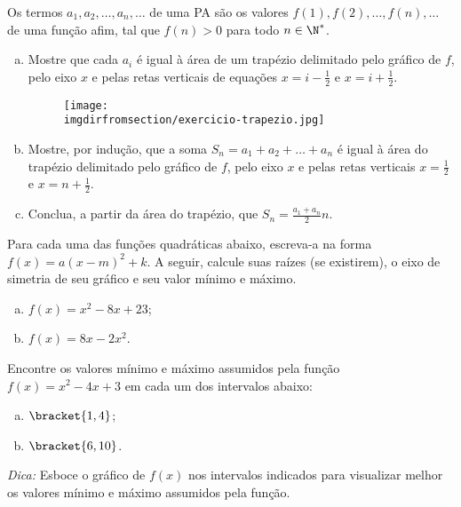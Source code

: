 \begin{exercise}
  Os termos $a_1, a_2, \dots, a_n, \dots$ de uma PA são os valores
  $f(1), f(2), \dots, f(n), \dots$ de uma função afim, tal que $f(n)
  >0$ para todo $n \in \N^\ast$.

  \begin{enumerate}[(a)]
    \item Mostre que cada $a_i$ é igual à área de um trapézio
    delimitado pelo gráfico de $f$, pelo eixo $x$ e pelas retas
    verticais de equações $x=i - \frac 1 2 $ e $x = i + \frac 1 2$.
    
    \begin{figure}[H]
      \centering\texttt{[image: \\imgdirfromsection/exercicio-trapezio.jpg]}
      \label{fig:exercicio-trapezio}
    \end{figure}

    \item Mostre, por indução, que a soma $S_n = a_1+a_2+ \dots + a_n$ é igual à
    área do trapézio delimitado pelo gráfico de $f$, pelo eixo $x$ e
    pelas retas verticais $x= \frac 1 2$ e $x = n + \frac 1 2 $.
    \item Conclua, a partir da área do trapézio, que $S_n = \frac{a_1+a_n} 2 n$.
  \end{enumerate}
\end{exercise}

\begin{exercise}
    Para cada uma das funções quadráticas abaixo, escreva-a na forma
$f(x)=a(x-m)^2+k$. A seguir, calcule suas raízes (se existirem), o
eixo de simetria de seu gráfico e seu valor mínimo e máximo.
%
\begin{enumerate}[(a)]
  \item $f(x) = x^2 -8x +23$;
  \item $f(x) = 8x - 2x^2$.
\end{enumerate}
\end{exercise}

\begin{exercise}
    Encontre os valores mínimo e máximo assumidos pela função $f(x)
= x^2 -4x +3$ em cada um dos intervalos abaixo:
\begin{enumerate}[(a)]
  \item $\bracket{1, 4}$;
  \item $\bracket{6, 10}$.
\end{enumerate}
\emph{Dica:} Esboce o gráfico de $f(x)$ nos intervalos indicados
para visualizar melhor os valores mínimo e máximo assumidos pela
função.
\end{exercise}

